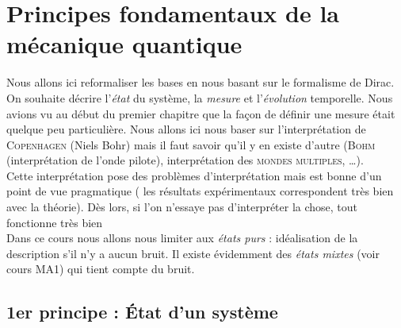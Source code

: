 \chapter{Principes fondamentaux de la mécanique quantique}

 Nous allons ici reformaliser les bases en nous basant sur le formalisme de Dirac. 
 On souhaite décrire l'\textit{état} du système, la \textit{mesure} et
 l'\textit{évolution} temporelle. Nous avions vu au début du premier chapitre 
 que la façon de définir une mesure était quelque peu particulière. Nous 
 allons ici nous baser sur l'interprétation de \textsc{Copenhagen} (Niels Bohr) mais 
 il faut savoir qu'il y en existe d'autre (\textsc{Bohm} (interprétation de l'onde 
 pilote), interprétation des \textsc{mondes multiples}, \dots).\\

  Cette interprétation 
 pose des  problèmes d'interprétation mais est bonne d'un point de vue pragmatique (
 les résultats expérimentaux correspondent très bien avec la théorie). Dès lors, si 
 l'on n'essaye pas d'interpréter la chose, tout fonctionne très bien\\
 
 Dans ce cours nous allons nous limiter aux \textit{états purs} : idéalisation 
 de la description s'il n'y a aucun bruit. Il existe évidemment des 
 \textit{états mixtes} (voir cours MA1) qui tient compte du bruit. 
 
 \section{1er principe : État d'un système}
